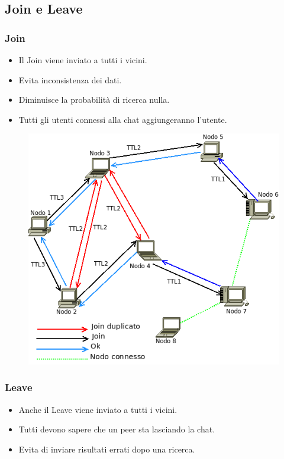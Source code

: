 \documentclass[a4paper,italian,12pt]{beamer}
\begin{document}
		\subsection{Join e Leave}
			\begin{frame}
				\frametitle{Join}
				\begin{itemize}
					\item Il Join viene inviato a tutti i vicini.
					\item Evita inconsistenza dei dati.
					\item Diminuisce la probabilità di ricerca nulla.
					\item Tutti gli utenti connessi alla chat aggiungeranno l'utente.
				\end{itemize}
				\begin{figure}[H]
					\begin{center}
						\includegraphics[scale=0.2]{etc/Join.png}
					\end{center}
				\end{figure}
			\end{frame}
			\begin{frame}
				\frametitle{Leave}
				\begin{itemize}
					\item Anche il Leave viene inviato a tutti i vicini.
					\item Tutti devono sapere che un peer sta lasciando la chat.
					\item Evita di inviare risultati errati dopo una ricerca.
				\end{itemize}
			\end{frame}
\end{document}
